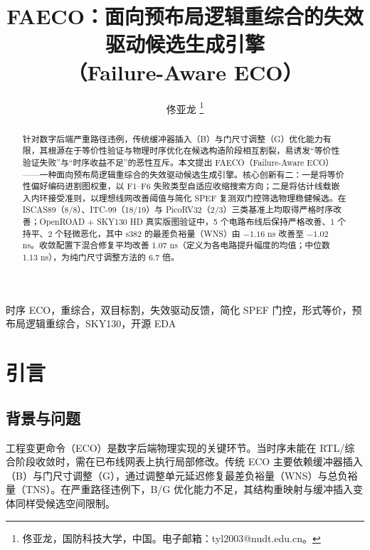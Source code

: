 \documentclass[journal]{IEEEtran}
\title{FAECO：面向预布局逻辑重综合的失效驱动候选生成引擎\\
（Failure-Aware ECO）}
\author{佟亚龙%
\thanks{佟亚龙，国防科技大学，中国。电子邮箱：tyl2003@nudt.edu.cn。}}
\begin{document}
\maketitle

\sloppy

\begin{abstract}
针对数字后端严重路径违例，传统缓冲器插入（B）与门尺寸调整（G）优化能力有限，其根源在于等价性验证与物理时序优化在候选构造阶段相互割裂，易诱发“等价性验证失败”与“时序收益不足”的恶性互斥。本文提出 FAECO（Failure-Aware ECO）——一种面向预布局逻辑重综合的失效驱动候选生成引擎。核心创新有二：一是将等价性偏好编码进割图权重，以 F1--F6 失败类型自适应收缩搜索方向；二是将估计线载嵌入内环接受准则，以理想线网改善阈值与简化 SPEF 复测双门控筛选物理稳健候选。在 ISCAS89（8/8）、ITC-99（18/19）与 PicoRV32（2/3）三类基准上均取得严格时序改善；OpenROAD + SKY130 HD 真实版图验证中，5 个电路布线后保持严格改善、1 个持平、2 个轻微恶化，其中 s382 的最差负裕量（WNS）由 $-1.16$ ns 改善至 $-1.02$ ns。收敛配置下混合修复平均改善 1.07 ns（定义为各电路提升幅度的均值；中位数 1.13 ns），为纯门尺寸调整方法的 6.7 倍。
\end{abstract}

\begin{IEEEkeywords}
时序 ECO，重综合，双目标割，失效驱动反馈，简化 SPEF 门控，形式等价，预布局逻辑重综合，SKY130，开源 EDA
\end{IEEEkeywords}

\section{引言}

\subsection{背景与问题}

工程变更命令（ECO）是数字后端物理实现的关键环节。当时序未能在 RTL/综合阶段收敛时，需在已布线网表上执行局部修改。传统 ECO 主要依赖缓冲器插入（B）与门尺寸调整（G），通过调整单元延迟修复最差负裕量（WNS）与总负裕量（TNS）。在严重路径违例下，B/G 优化能力不足，其结构重映射与缓冲插入变体同样受候选空间限制\cite{chen2012metal,chen2012fixability,liang2012buffer,ho2010eco}。
\end{document}

